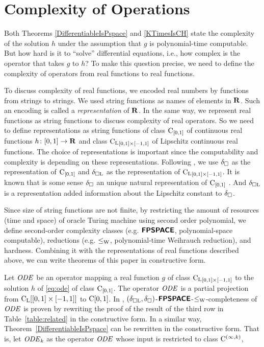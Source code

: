 \section{Complexity of Operations}

Both Theorems \ref{DifferentiableIsPspace} and \ref{KTimesIsCH}
state the complexity of the solution $h$ under the assumption 
that $g$ is polynomial-time computable.
But how hard is it to ``solve'' differential equations,
i.e., how complex is the operator that takes $g$ to $h$? 
To make this question precise,
we need to define the complexity of operators from real functions to real functions.

To discuss complexity of real functions,
we encoded real numbers by functions from strings to strings.
We used string functions as names of elements in $\mathbf R$. 
Such an encoding is called a \emph{representation} of $\mathbf R$.
In the same way, we represent real functions as string functions
to discuss complexity of real operators.
So we need to define representations as string functions of
class $\mathrm C_{[0, 1]}$ of continuous real functions $h \colon [0,1] \to \mathbf R$ 
and class ${\mathrm C _{\mathrm L}}_{[0, 1] \times [-1, 1]}$ of Lipschitz continuous real functions.
The choice of representations is important since the computability and complexity is depending on these representations.
Following \cite{kawamura2010operators},
we use $\delta _\square$ as the representation of $\mathrm C_{[0,1]}$ and $\delta _{\square \mathrm L}$ as the representation of ${\mathrm C _{\mathrm L}}_{[0, 1] \times [-1, 1]}$.
It is known that is some sense $\delta _\square$ an unique natural representation of $\mathrm C_{[0, 1]}$ \cite{kawamura11:_funct_space_repres_and_polyn_time_comput}.
And $\delta _{\square \mathrm L}$ is a representation
added information about the Lipschitz constant to $\delta _\square$.

Since size of string functions are not finite,
by restricting the amount of resources (time and space) of oracle Turing machine using second order polynomial,
we define second-order complexity classes
(e.g. $\text{\bfseries \sffamily \upshape FPSPACE}$, polynomial-space computable),
reductions (e.g. $\leq _{\mathrm W}$, polynomial-time Weihrauch reduction),
and hardness.
Combining it with the representations of real functions described above,
we can write theorems of this paper in constructive form.

Let $\mathit{ODE}$ be an operator mapping a real function $g$ of class ${\mathrm C _{\mathrm L}}_{[0, 1] \times [-1, 1]}$ to
the solution $h$ of \eqref{eq:ode} of class $\mathrm C_{[0, 1]}$.
The operator $\mathit{ODE}$ is a partial projection from ${\mathrm C _{\mathrm L}} [[0, 1] \times [-1, 1]]$ to $\mathrm C [0, 1]$.
In \cite[Theorem 4.9]{kawamura2010operators},
$(\delta _{\square \mathrm L}, \delta _\square)$-$\text{\bfseries \sffamily \upshape FPSPACE}$-$\leq _{\mathrm W}$-completeness of $\mathit{ODE}$ is proven
by rewriting the proof of the result of the third row in Table~\ref{table:related} in the constructive form.
In a similar way, Theorem~\ref{DifferentiableIsPspace} can be rewritten in the constructive form.
That is, let $\mathit{ODE} _k$ as the operator $\mathit{ODE}$ whose input is restricted to class $\mathrm C^{(\infty, k)}$,

